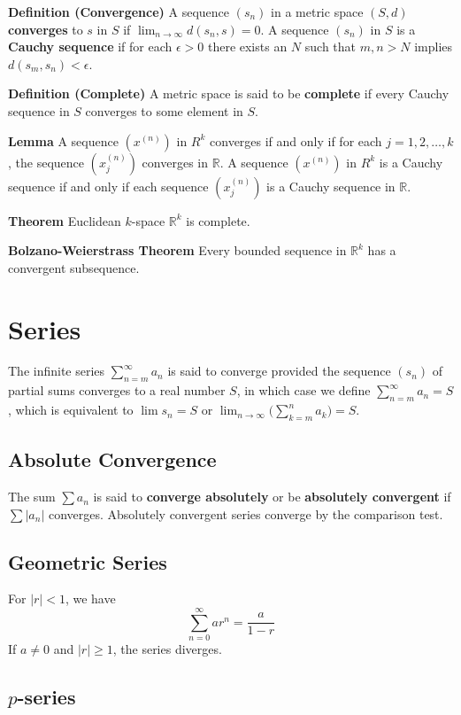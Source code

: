 \documentclass[12pt]{article}
\newcommand{\R}{\mathbb{R}}
\begin{document}
\textbf{Definition (Convergence)} A sequence $(s_n)$ in a metric space $(S,d)$ \textbf{converges} to $s$ in $S$ if $\lim_{n \to \infty} d(s_n, s) = 0$. A sequence $(s_n)$ in $S$ is a \textbf{Cauchy sequence} if for each $\epsilon > 0$ there exists an $N$ such that $m,n > N$ implies $d(s_m, s_n) < \epsilon$.

\textbf{Definition (Complete)} A metric space is said to be \textbf{complete} if every Cauchy sequence in $S$ converges to some element in $S$.

\textbf{Lemma} A sequence $(x^{(n)})$ in $R^k$ converges if and only if for each $j = 1,2,\ldots,k$, the sequence $(x_j^{(n)})$ converges in $\R$. A sequence $(x^{(n)})$ in $R^k$ is a Cauchy sequence if and only if each sequence $(x_j^{(n)})$ is a Cauchy sequence in $\R$. 

\textbf{Theorem} Euclidean $k$-space $\R^k$ is complete.

\textbf{Bolzano-Weierstrass Theorem} Every bounded sequence in $\R^k$ has a convergent subsequence.

\section{Series}

The infinite series $\sum_{n=m}^\infty a_n$ is said to converge provided the sequence $(s_n)$ of partial sums converges to a real number $S$, in which case we define $\sum_{n=m}^\infty a_n = S$, which is equivalent to $\lim s_ n = S$ or $\lim_{n \to \infty} \Big( \sum_{k=m}^n a_k \Big) = S$.

\subsection{Absolute Convergence}

The sum $\sum a_n$ is said to \textbf{converge absolutely} or be \textbf{absolutely convergent} if $\sum |a_n|$ converges. Absolutely convergent series converge by the comparison test.

\subsection{Geometric Series}

For $|r| < 1$, we have $$\sum_{n=0}^\infty ar^n = \frac{a}{1-r}$$ If $a \neq 0$ and $|r| \geq 1$, the series diverges.

\subsection{$p$-series}
\end{document}
